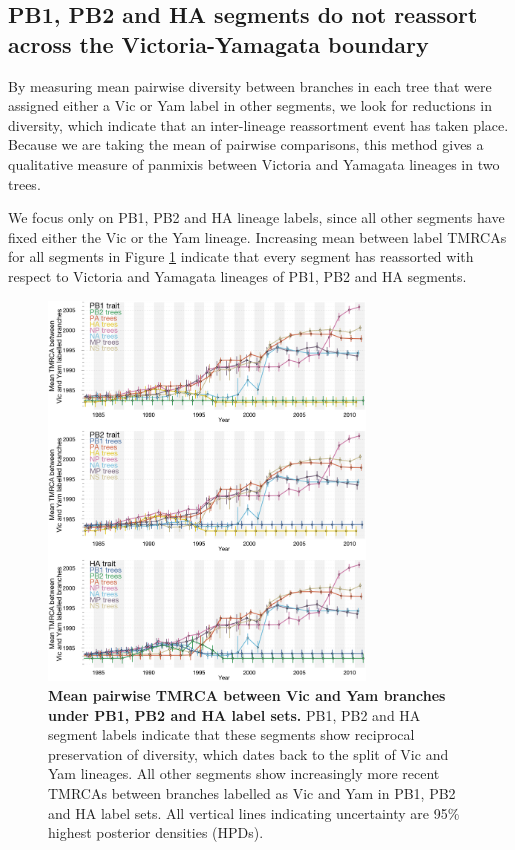 \documentclass[11pt,oneside,letterpaper]{article}
\begin{document}
\subsection*{PB1, PB2 and HA segments do not reassort across the Victoria-Yamagata boundary}
By measuring mean pairwise diversity between branches in each tree that were assigned either a Vic or Yam label in other segments, we look for reductions in diversity, which indicate that an inter-lineage reassortment event has taken place.
Because we are taking the mean of pairwise comparisons, this method gives a qualitative measure of panmixis between Victoria and Yamagata lineages in two trees.

We focus only on PB1, PB2 and HA lineage labels, since all other segments have fixed either the Vic or the Yam lineage.
Increasing mean between label TMRCAs for all segments in Figure \ref{betweenDiversity} indicate that every segment has reassorted with respect to Victoria and Yamagata lineages of PB1, PB2 and HA segments.

\begin{figure}
	\centering		
	\includegraphics[width=0.75\textwidth]{figures/InfB_betweenDiversity.png}
	\caption{\textbf{Mean pairwise TMRCA between Vic and Yam branches under PB1, PB2 and HA label sets.}
PB1, PB2 and HA segment labels indicate that these segments show reciprocal preservation of diversity, which dates back to the split of Vic and Yam lineages.
All other segments show increasingly more recent TMRCAs between branches labelled as Vic and Yam in PB1, PB2 and HA label sets.
All vertical lines indicating uncertainty are 95\% highest posterior densities (HPDs).}
	\label{betweenDiversity}
\end{figure}
\end{document}
